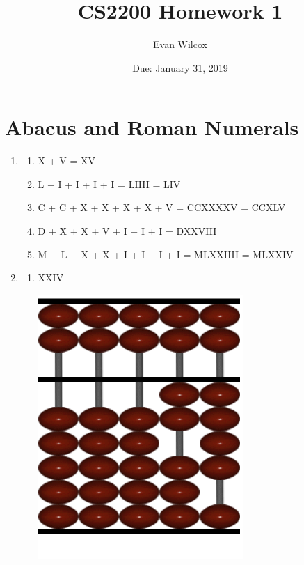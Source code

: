 \documentclass[a4paper]{article}
\title{CS2200 Homework 1}
\author{Evan Wilcox}
\date{Due: January 31, 2019}
\begin{document}
    \maketitle

    \section{Abacus and Roman Numerals}
    \begin{enumerate}
        \item
        \begin{enumerate}
            \item X + V = XV
            \item L + I + I + I + I = LIIII = LIV
            \item C + C + X + X + X + X + V = CCXXXXV = CCXLV
            \item D + X + X + V + I + I + I = DXXVIII
            \item M + L + X + X + I + I + I + I = MLXXIIII = MLXXIV
        \end{enumerate}

        \vspace{1cm}

        \item
        \begin{enumerate}
            \item XXIV
            \begin{center}
                \includegraphics[scale=0.6]{2a}
            \end{center}
            

\end{enumerate}
\end{enumerate}
\end{document}
